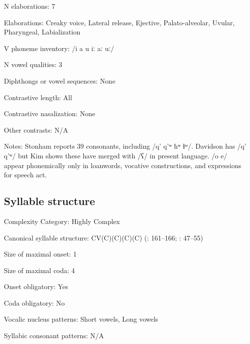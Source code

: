 {\begin{appendixdesc}
\item[N elaborations:] 7

\item[Elaborations:] Creaky voice, Lateral release, Ejective, Palato-alveolar, Uvular, Pharyngeal, Labialization

\item[V phoneme inventory:] /i a u iː aː uː/

\item[N vowel qualities:] 3

\item[Diphthongs or vowel sequences:] None

\item[Contrastive length:] All

\item[Contrastive nasalization:] None

\item[Other contrasts:] N/A

\item[Notes:] Stonham reports 39 consonants, including /q’ q’ʷ ħʷ ɬʷ/. Davidson has /q’ q’ʷ/ but Kim shows these have merged with /ʕ/ in present language. /o e/ appear phonemically only in loanwords, vocative constructions, and expressions for speech act.
\end{appendixdesc}
\subsection*{Syllable structure}
\begin{appendixdesc}

\item[Complexity Category:] Highly Complex

\item[Canonical syllable structure:] CV(C)(C)(C)(C) (\citealt{Kim2003}: 161--166; \citealt{Stonham1999}: 47--55)

\item[Size of maximal onset:] 1

\item[Size of maximal coda:] 4

\item[Onset obligatory:] Yes

\item[Coda obligatory:] No

\item[Vocalic nucleus patterns:] Short vowels, Long vowels

\item[Syllabic consonant patterns:] N/A


\end{appendixdesc}}
